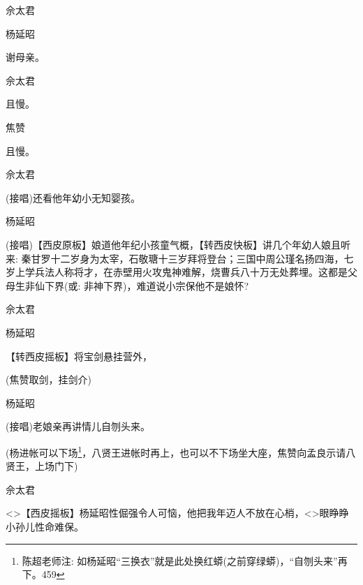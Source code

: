 {佘太君\hspace{20pt}~


杨延昭\hspace{20pt}~

谢母亲。

佘太君\hspace{20pt}~

且慢。

焦赞\hspace{30pt}~

且慢。

佘太君\hspace{20pt}~

(接唱)还看他年幼小无知婴孩。

杨延昭

(接唱)【{\akai 西皮原板}】娘道他年纪小孩童气概，【{\footnotesize 转}{\akai 西皮快板}】讲几个年幼人娘且听来: 秦甘罗十二岁身为太宰，石敬瑭十三岁拜将登台；三国中周公瑾名扬四海，七岁上学兵法人称将才，在赤壁用火攻鬼神难解，烧曹兵八十万无处葬埋。这都是父母生非仙下界({\akai 或}: 非神下界)，难道说小宗保他不是娘怀?

佘太君


杨延昭


【{\footnotesize 转}{\akai 西皮摇板}】将宝剑悬挂营外，

(焦赞取剑，挂剑介)

杨延昭\hspace{20pt}~

(接唱)老娘亲再讲情儿自刎头来。

(杨进帐可以下场\footnote{ 陈超老师注: 如杨延昭``三换衣''就是此处换红蟒(之前穿绿蟒)，``自刎头来''再下。{459}}，八贤王进帐时再上，也可以不下场坐大座，焦赞向孟良示请八贤王，上场门下)

佘太君

\textless{}\!\textgreater{}【{\akai 西皮摇板}】杨延昭性倔强令人可恼，他把我年迈人不放在心梢，\textless{}\!\textgreater{}眼睁睁小孙儿性命难保。

}

